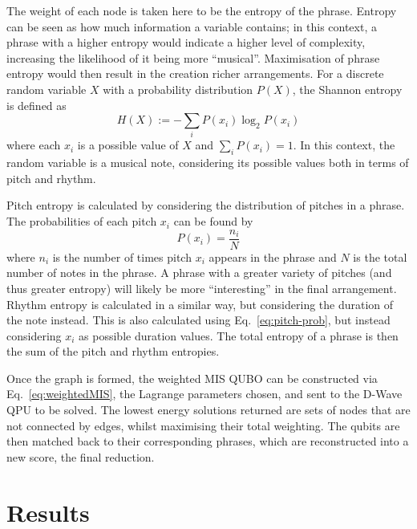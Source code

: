 \documentclass[aps,pra,12pt,onecolumn]{revtex4-2}
\begin{document}
The weight of each node is taken here to be the entropy of the phrase. Entropy can be seen as how much  information a variable contains; in this context, a phrase with a higher entropy would indicate a higher level of complexity, increasing the likelihood of it being more ``musical''. Maximisation of phrase entropy would then result in the creation richer arrangements. For a discrete random variable $X$ with a probability distribution $P(X)$, the Shannon entropy is defined as
\begin{equation}
    H(X):=-\sum_i P(x_i)\log_2 P(x_i)
    \label{eq:entropy}
\end{equation}
where each $x_i$ is a possible value of $X$ and ${\sum_i P(x_i)=1}$. In this context, the random variable is a musical note, considering its possible values both in terms of pitch and rhythm.

Pitch entropy is calculated by considering the distribution of pitches in a phrase. The probabilities of each pitch $x_i$ can be found by
\begin{equation}
    P(x_i)=\frac{n_i}{N}
    \label{eq:pitch-prob}
\end{equation}
where $n_i$ is the number of times pitch $x_i$ appears in the phrase and $N$ is the total number of notes in the phrase. A phrase with a greater variety of pitches (and thus greater entropy) will likely be more ``interesting'' in the final arrangement.
Rhythm entropy is calculated in a similar way, but considering the duration of the note instead. This is also calculated using Eq.\ \ref{eq:pitch-prob}, but instead considering $x_i$ as possible duration values.
The total entropy of a phrase is then the sum of the pitch and rhythm entropies.

Once the graph is formed, the weighted MIS QUBO can be constructed via Eq.\ \ref{eq:weightedMIS}, the Lagrange parameters chosen, and sent to the D-Wave QPU to be solved. The lowest energy solutions returned are sets of nodes that are not connected by edges, whilst maximising their total weighting. The qubits are then matched back to their corresponding phrases, which are reconstructed into a new score, the final reduction.

\section{Results}
\end{document}
